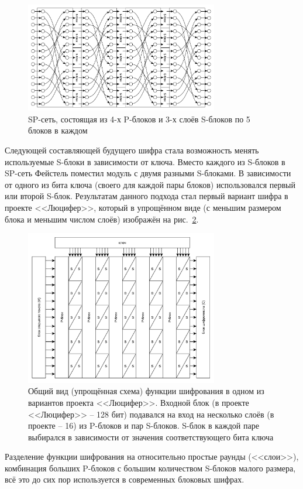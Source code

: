 \begin{figure}[!htb]
	\centering
	\includegraphics[width=0.75\textwidth]{pic/sp-network}
  \caption{SP-сеть, состоящая из 4-х P-блоков и 3-х слоёв S-блоков по 5 блоков в каждом}
  \label{fig:sp-network}
\end{figure}

Следующей составляющей будущего шифра стала возможность менять используемые S-блоки в зависимости от ключа. Вместо каждого из S-блоков в SP-сеть Фейстель поместил модуль с двумя разными S-блоками. В зависимости от одного из бита ключа (своего для каждой пары блоков) использовался первый или второй S-блок. Результатам данного подхода стал первый вариант шифра в проекте <<Люцифер>>, который в упрощённом виде (с меньшим размером блока и меньшим числом слоёв) изображён на рис.~\ref{fig:lucifer}.

\begin{figure}[!htb]
	\centering
	\includegraphics[width=0.75\textwidth]{pic/lucifer}
  \caption{Общий вид (упрощённая схема) функции шифрования в одном из вариантов проекта <<Люцифер>>. Входной блок (в проекте <<Люцифер>> -- 128 бит) подавался на вход на несколько слоёв (в проекте -- 16) из P-блоков и пар S-блоков. S-блок в каждой паре выбирался в зависимости от значения соответствующего бита ключа}
  \label{fig:lucifer}
\end{figure}

Разделение функции шифрования на относительно простые раунды (<<слои>>), комбинация больших P-блоков с большим количеством S-блоков малого размера, всё это до сих пор используется в современных блоковых шифрах.